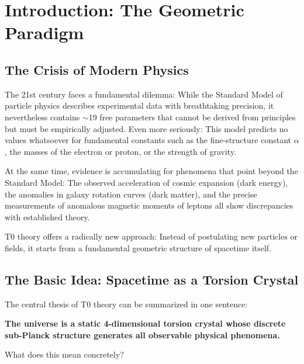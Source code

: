 	
	
	
	\section{Introduction: The Geometric Paradigm}
	
	\subsection{The Crisis of Modern Physics}
	
	The 21st century faces a fundamental dilemma: While the Standard Model of particle physics describes experimental data with breathtaking precision, it nevertheless contains $\sim$19 free parameters that cannot be derived from principles but must be empirically adjusted. Even more seriously: This model predicts no values whatsoever for fundamental constants such as the fine-structure constant \(\alpha\), the masses of the electron or proton, or the strength of gravity.
	
	At the same time, evidence is accumulating for phenomena that point beyond the Standard Model: The observed acceleration of cosmic expansion (dark energy), the anomalies in galaxy rotation curves (dark matter), and the precise measurements of anomalous magnetic moments of leptons all show discrepancies with established theory.
	
	T0 theory offers a radically new approach: Instead of postulating new particles or fields, it starts from a fundamental geometric structure of spacetime itself.
	
	\subsection{The Basic Idea: Spacetime as a Torsion Crystal}
	
	The central thesis of T0 theory can be summarized in one sentence:
	
	\begin{center}
		\textbf{The universe is a static 4-dimensional torsion crystal whose discrete sub-Planck structure generates all observable physical phenomena.}
	\end{center}
	
	What does this mean concretely?
	
